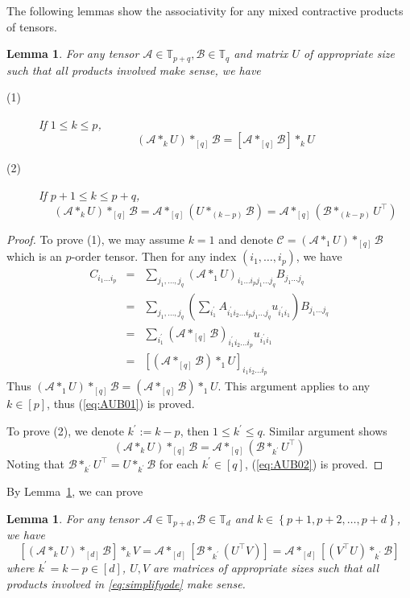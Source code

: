 \documentclass[11pt, oneside]{article}  %
\newtheorem{lem}[thm]{Lemma}
\newcommand{\set}[1]{\left\{#1\right\}}
\newcommand{\p}{\prime}
\newcommand{\TT}{\mathbb{T}}
\newcommand{\A}{\mathcal{A}}
\newcommand{\B}{\mathcal{B}}
\newcommand{\C}{\mathcal{C}}
\newcommand{\beq}{\begin{equation}}
\newcommand{\eeq}{\end{equation}}
\newcommand{\beyy}{\begin{eqnarray*}}
\newcommand{\eeyy}{\end{eqnarray*}}
\begin{document}
The following lemmas show the associativity for any mixed contractive products of tensors.  
\begin{lem}\label{le4ode1}
For any tensor $\A\in\TT_{p+q},\B\in\TT_{q}$ and matrix $U$ of appropriate size such that all products involved make sense, we have   
\begin{description}
\item[(1)]  If $1\le k\le p$,
\beq\label{eq:AUB01}
(\A\ast_{k} U)\ast_{[q]} \B = \left[ \A \ast_{[q]} \B\right] \ast_{k} U
\eeq
\item[(2)]  If $p+1\le k\le p+q$, 
 \beq\label{eq:AUB02}
(\A\ast_{k} U)\ast_{[q]} \B = \A \ast_{[q]} (U\ast_{(k-p)}\B) = \A \ast_{[q]} (\B\ast_{(k-p)}U^{\top})  
\eeq
\end{description}
\end{lem}
\begin{proof}
To prove (1), we may assume $k=1$ and denote $\C = (\A\ast_{1} U)\ast_{[q]} \B$ which is an $p$-order tensor. Then for any index 
$(i_{1},\ldots,i_{p})$, we have 
\beyy
C_{i_{1}\ldots i_{p}} 
&=& \sum_{j_1,\ldots, j_q} (\A\ast_{1} U)_{i_1\ldots i_p j_1\ldots j_q} B_{j_1\ldots j_q} \\
&=& \sum_{j_1,\ldots, j_q} \left(\sum_{i_1^{\p}} A_{i_{1}^{\p}i_2\ldots i_p j_1\ldots j_q}u_{i_1^{\p}i_1}\right)B_{j_1\ldots j_q} \\
&=& \sum_{i_1^{\p}} \left(\A\ast_{[q]}\B\right)_{i_1^{\p}i_2\ldots i_p} u_{i_1^{\p}i_1} \\ 
&=& \left[\left(\A\ast_{[q]}\B\right)\ast_{1} U \right]_{i_1i_2\ldots i_p} 
\eeyy
Thus $(\A\ast_{1} U)\ast_{[q]} \B =\left(\A\ast_{[q]}\B\right)\ast_{1} U$. This argument applies to any $k\in [p]$, thus (\ref{eq:AUB01}) is 
proved.  

To prove (2), we denote $k^{\p}:=k-p$, then $1\le k^{\p}\le q$. Similar argument shows 
\[ (\A\ast_{k} U)\ast_{[q]} \B =\A \ast_{[q]} (\B\ast_{k^{\p}}U^{\top}) \]
Noting that $\B\ast_{k^{\p}}U^{\top}=U\ast_{k^{\p}}\B$ for each $k^{\p}\in [q]$, (\ref{eq:AUB02}) is proved.  
\end{proof} 

By Lemma~\ref{le4ode1}, we can prove  
\begin{lem}\label{le4ode2}
For any tensor $\A\in\TT_{p+d},\B\in\TT_{d}$ and $k\in \set{p+1,p+2, \ldots, p+d}$, we have 
\beq\label{eq:simplifyode}
\left[ (\A\ast_{k} U)\ast_{[d]} \B\right]\ast_{k} V = \A \ast_{[d]} \left[\B\ast_{k^{\p}} (U^{\top}V) \right] =\A \ast_{[d]} \left[(V^{\top}U)\ast_{k^{\p}} \B \right] 
\eeq
where $k^{\p}=k-p\in [d]$, $U,V$ are matrices of appropriate sizes such that all products involved in \eqref{eq:simplifyode} make sense. 
\end{lem}
\end{document}
